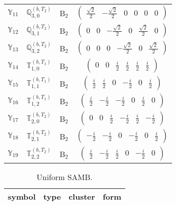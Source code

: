 \documentclass[fleqn,10pt,landscape]{article}
\begin{document}
\begin{itemize}
\begin{center}
\begin{longtable}{c|c|c|c}
$ \mathbb{Y}_{11} $ & $\mathbb{Q}_{3,0}^{(b,T_{2})}$ & B$_{2}$ & $\begin{pmatrix} \frac{\sqrt{2}}{2} & - \frac{\sqrt{2}}{2} & 0 & 0 & 0 & 0 \end{pmatrix}$ \\
$ \mathbb{Y}_{12} $ & $\mathbb{Q}_{3,1}^{(b,T_{2})}$ & B$_{2}$ & $\begin{pmatrix} 0 & 0 & - \frac{\sqrt{2}}{2} & 0 & \frac{\sqrt{2}}{2} & 0 \end{pmatrix}$ \\
$ \mathbb{Y}_{13} $ & $\mathbb{Q}_{3,2}^{(b,T_{2})}$ & B$_{2}$ & $\begin{pmatrix} 0 & 0 & 0 & - \frac{\sqrt{2}}{2} & 0 & \frac{\sqrt{2}}{2} \end{pmatrix}$ \\
$ \mathbb{Y}_{14} $ & $\mathbb{T}_{1,0}^{(b,T_{1})}$ & B$_{2}$ & $\begin{pmatrix} 0 & 0 & \frac{i}{2} & \frac{i}{2} & \frac{i}{2} & \frac{i}{2} \end{pmatrix}$ \\
$ \mathbb{Y}_{15} $ & $\mathbb{T}_{1,1}^{(b,T_{1})}$ & B$_{2}$ & $\begin{pmatrix} \frac{i}{2} & \frac{i}{2} & 0 & - \frac{i}{2} & 0 & \frac{i}{2} \end{pmatrix}$ \\
$ \mathbb{Y}_{16} $ & $\mathbb{T}_{1,2}^{(b,T_{1})}$ & B$_{2}$ & $\begin{pmatrix} \frac{i}{2} & - \frac{i}{2} & - \frac{i}{2} & 0 & \frac{i}{2} & 0 \end{pmatrix}$ \\
$ \mathbb{Y}_{17} $ & $\mathbb{T}_{2,0}^{(b,T_{2})}$ & B$_{2}$ & $\begin{pmatrix} 0 & 0 & \frac{i}{2} & - \frac{i}{2} & \frac{i}{2} & - \frac{i}{2} \end{pmatrix}$ \\
$ \mathbb{Y}_{18} $ & $\mathbb{T}_{2,1}^{(b,T_{2})}$ & B$_{2}$ & $\begin{pmatrix} - \frac{i}{2} & - \frac{i}{2} & 0 & - \frac{i}{2} & 0 & \frac{i}{2} \end{pmatrix}$ \\
$ \mathbb{Y}_{19} $ & $\mathbb{T}_{2,2}^{(b,T_{2})}$ & B$_{2}$ & $\begin{pmatrix} \frac{i}{2} & - \frac{i}{2} & \frac{i}{2} & 0 & - \frac{i}{2} & 0 \end{pmatrix}$ \\
\end{longtable}
\end{center}
\begin{center}
\renewcommand{\arraystretch}{1.3}
\begin{longtable}{c|c|c|c}
\caption{Uniform SAMB.}
 \\
 \hline \hline
symbol & type & cluster & form \\ \hline \endfirsthead


\end{longtable}
\end{center}
\end{itemize}
\end{document}
